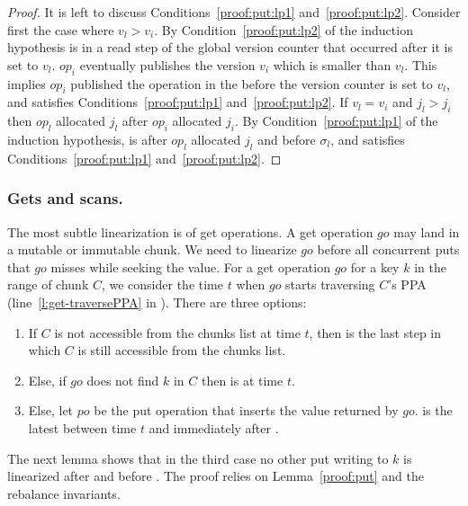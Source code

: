 \begin{proof}
It is left to discuss Conditions~\ref{proof:put:lp1} and~\ref{proof:put:lp2}. Consider first the case where $v_l>v_i$. By Condition~\ref{proof:put:lp2} of the induction hypothesis  is in a read step of the global version counter that occurred after it is set to $v_l$. $op_i$ eventually publishes the version $v_i$ which is smaller than $v_l$. This implies $op_i$ published the operation in the  before the version counter is set to $v_l$, and   satisfies Conditions~\ref{proof:put:lp1} and~\ref{proof:put:lp2}. If $v_l =v_i$ and $j_l>j_i$ then $op_l$ allocated $j_l$ after $op_i$ allocated $j_i$. By Condition~\ref{proof:put:lp1} of the induction hypothesis,  is after $op_l$ allocated $j_l$  and before $\sigma_l$, and   satisfies Conditions~\ref{proof:put:lp1} and~\ref{proof:put:lp2}. 

\end{proof}


\subsubsection{Gets and scans.}
\label{ssec:get-proof}

The most subtle linearization is of get operations.
A get operation $go$ may land in a mutable or immutable chunk. 
We need to linearize $go$ before all concurrent puts that $go$ misses while seeking the value.
For a get operation $go$ for a key $k$ in the range of chunk $C$, we consider the time $t$ when $go$ starts traversing $C$'s PPA (line~\ref{l:get-traversePPA} in ). There are three options:
\begin{enumerate}
\setlength{\itemsep}{0pt}
\setlength{\parskip}{0pt}
\item If $C$ is not accessible from the chunks list at time $t$, then  is the last step in which $C$ is still accessible from the chunks list.
\item Else, if $go$ does not find $k$ in $C$ then  is at time $t$.
\item Else, let $po$ be the put operation that inserts the value returned by $go$.  is the latest between time $t$ and immediately after .
\end{enumerate}

The next lemma shows that in the third case no other put writing to $k$ is linearized after  and before .
The proof relies on 
Lemma~\ref{proof:put} and the rebalance invariants.

